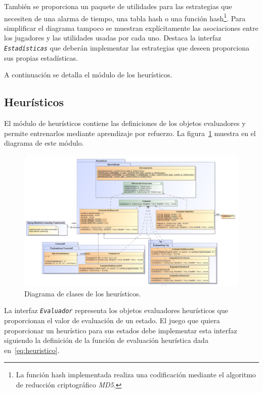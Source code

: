También se proporciona un paquete de utilidades para las estrategias que necesiten de una alarma de tiempo, una tabla hash o una función hash\footnote{La función hash implementada realiza una codificación mediante el algoritmo de reducción criptográfico \textit{MD5}.}.
Para simplificar el diagrama tampoco se muestran explícitamente las asociaciones entre los jugadores y las utilidades usadas por cada uno.
Destaca la interfaz \texttt{\textit{Estadísticas}} que deberán implementar las estrategias que deseen proporciona sus propias estadísticas.

\bigskip
A continuación se detalla el módulo de los heurísticos.

\subsection{Heurísticos}
\label{ssec:arquitectura_heuristicos}
El módulo de heurísticos contiene las definiciones de los objetos evaluadores y permite entrenarlos mediante aprendizaje por refuerzo.
La figura~\ref{fig:diagramaclases_heuristicos} muestra en el diagrama de este módulo.

\begin{figure}[!p]
	\centering
	\includegraphics[scale=0.4,angle=90]{contenido/cap6/imagenes/diagramaclases_heuristicos.eps}
	\caption{Diagrama de clases de los heurísticos.}
	\label{fig:diagramaclases_heuristicos}
\end{figure}

La interfaz \texttt{\textit{Evaluador}} representa los objetos evaluadores heurísticos que proporcionan el valor de evaluación de un estado.
El juego que quiera proporcionar un heurístico para sus estados debe implementar esta interfaz siguiendo la definición de la función de evaluación heurística dada en~\ref{eq:heuristico}.

